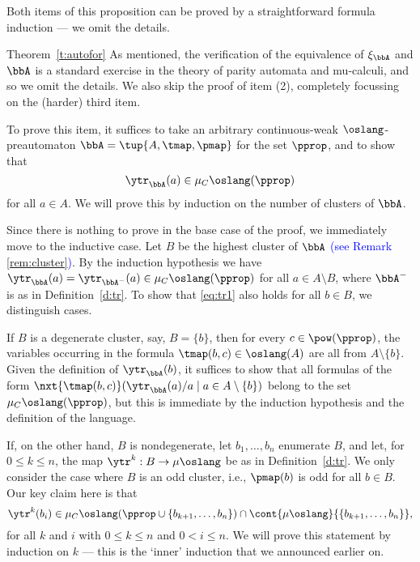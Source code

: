 Both items of this proposition can be proved by a straightforward formula 
induction --- we omit the details.


\begin{proofof}{Theorem~\ref{t:autofor}}
As mentioned, the verification of the equivalence of $\xi_{\bbA}$ and $\bbA$
is a standard exercise in the theory of parity automata and mu-calculi, and so
we omit the details.
We also skip the proof of item (2), completely focussing on the (harder) third 
item.

To prove this item, it suffices to take an arbitrary continuous-weak 
$\oslang$-preautomaton $\bbA = \tup{A,\tmap,\pmap}$ for the set $\pprop$,
and to show that 
\begin{equation}
\label{eq:tr1}
\ytr_{\bbA}(a) \in \mu_{C}\oslang(\pprop)
\end{equation}
for all $a \in A$.
We will prove this by induction on the number of clusters of $\bbA$.

Since there is nothing to prove in the base case of the proof, we immediately
move to the inductive case.
Let $B$ be the highest cluster of $\bbA$ \textcolor{blue}{(see Remark \ref{rem:cluster})}.
By the induction hypothesis we have $\ytr_{\bbA}(a) = \ytr_{\bbA^{-}}(a) \in 
\mu_{C}\oslang(\pprop)$ for all $a \in A \setminus B$, where 
$\bbA^{-}$ is as in Definition~\ref{d:tr}.
To show that \eqref{eq:tr1} also holds for all $b \in B$, we distinguish cases.

If $B$ is a degenerate cluster, say, $B = \{ b \}$, then for every $c \in 
\pow(\pprop)$, the variables occurring in the formula $\tmap(b,c) \in \oslang(A)$
are all from $A \setminus \{ b \}$.
Given the definition of $\ytr_{\bbA}(b)$, it suffices to show that all formulas 
of the form $\nxt{\tmap(b,c)}(\ytr_{\bbA}(a)/a \mid a \in A \setminus \{ b \})$
belong to the set $\mu_{C}\oslang(\pprop)$, but this is immediate by the 
induction hypothesis and the definition of the language.

If, on the other hand, $B$ is nondegenerate, let $b_{1},\ldots,b_{n}$ enumerate
$B$, and let, for $0\leq k \leq n$, the map $\ytr^{k}: B \to \mu\oslang$ be as in
Definition~\ref{d:tr}.
We only consider the case where $B$ is an odd cluster, i.e., $\pmap(b)$ is odd
for all $b \in B$.
Our key claim here is that 
\begin{equation}
\label{eq:tr2}
\ytr^{k}(b_{i}) \in \mu_{C}\oslang(\pprop \cup \{ b_{k+1},\ldots,b_{n}\}) \cap 
\cont{\mu\oslang}{\{ b_{k+1},\ldots,b_{n}\}},
\end{equation}
for all $k$ and $i$ with $0 \leq k \leq n$ and $0 < i \leq n$.
We will prove this statement by induction on $k$ --- this is the `inner' 
induction that we announced earlier on.


\end{proofof}
